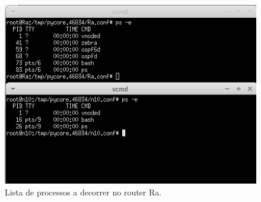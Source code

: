 \documentclass[a4paper]{article}
\begin{document}
\begin{figure}[!htb]
    \centering
    \includegraphics[scale=1]{parte2/processos.png}\newline
    \caption{Lista de processos a decorrer no router Ra.}
    \label{fig:my_label}
\end{figure}

\newpage
\end{document}

